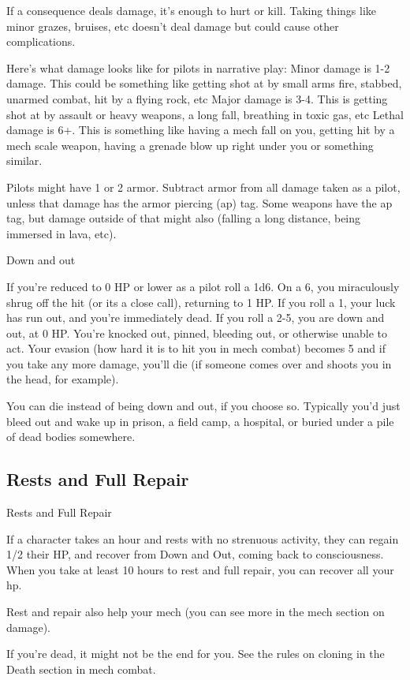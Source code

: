 If a consequence deals damage, it’s enough to hurt or kill. Taking things like minor grazes,
bruises, etc doesn’t deal damage but could cause other complications.

Here’s what damage looks like for pilots in narrative play:
Minor damage is 1-2 damage. This could be something like getting shot at by small arms fire,
stabbed, unarmed combat, hit by a flying rock, etc
Major damage is 3-4. This is getting shot at by assault or heavy weapons, a long fall, breathing
in toxic gas, etc
Lethal damage is 6+. This is something like having a mech fall on you, getting hit by a mech
scale weapon, having a grenade blow up right under you or something similar.

Pilots might have 1 or 2 armor. Subtract armor from all damage taken as a pilot, unless that
damage has the armor piercing (ap) tag. Some weapons have the ap tag, but damage outside of
that might also (falling a long distance, being immersed in lava, etc).

                                                 Down and out




If you’re reduced to 0 HP or lower as a pilot roll a 1d6. On a 6, you miraculously shrug off the hit
(or its a close call), returning to 1 HP. If you roll a 1, your luck has run out, and you’re immediately
dead. If you roll a 2-5, you are down and out, at 0 HP. You’re knocked out, pinned, bleeding out,
or otherwise unable to act. Your evasion (how hard it is to hit you in mech combat) becomes 5
and if you take any more damage, you’ll die (if someone comes over and shoots you in the head,
for example).


You can die instead of being down and out, if you choose so. Typically you’d just bleed out and
wake up in prison, a field camp, a hospital, or buried under a pile of dead bodies somewhere.

\subsection{Rests and Full Repair}

                                         Rests and Full Repair

If a character takes an hour and rests with no strenuous activity, they can regain 1/2 their HP, and
recover from Down and Out, coming back to consciousness. When you take at least 10 hours to
rest and full repair, you can recover all your hp.


Rest and repair also help your mech (you can see more in the mech section on damage).


If you’re dead, it might not be the end for you. See the rules on cloning in the Death section in
mech combat.
